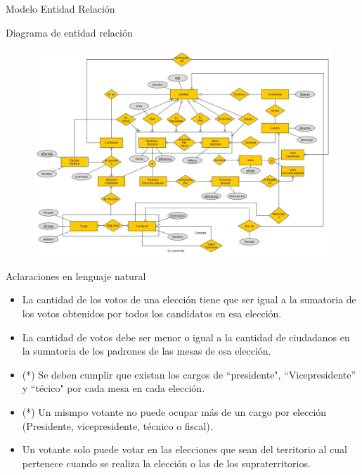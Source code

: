 \begin{section}{Modelo Entidad Relaci\'on}

\begin{subsection}{Diagrama de entidad relaci\'on}

\begin{figure}[H]
        \centering
        \includegraphics[angle=270,scale=0.4]{der.jpg}
\end{figure}

\end{subsection}

\begin{subsection}{Aclaraciones en lenguaje natural}

\begin{itemize}

\item La cantidad de los votos de una elecci\'on tiene que ser igual a la sumatoria de los votos obtenidos por todos los candidatos en esa elecci\'on.

\item La cantidad de votos debe ser menor o igual a la cantidad de ciudadanos en la sumatoria de los padrones de las mesas de esa elecci\'on.

\item (*) Se deben cumplir que existan los cargos de ``presidente", ``Vicepresidente'' y ``t\'ecico" por cada mesa en cada elecci\'on.

\item (*) Un mismpo votante no puede ocupar m\'as de un cargo por elecci\'on (Presidente, vicepresidente, t\'ecnico o fiscal).

\item Un votante solo puede votar en las elecciones que sean del territorio al cual pertenece cuando se realiza la elecci\'on o las de los supraterritorios.


\end{itemize}
\end{subsection}
\end{section}
